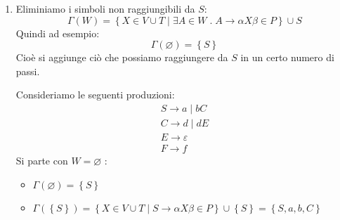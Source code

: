\documentclass[a4paper]{article}
\begin{document}
\begin{enumerate}
\begin{enumerate}
\begin{example}
\begin{itemize}
          \item \( \Gamma^3(\varnothing) = \Gamma(\left\{ B, S \right\}) \)\\
            \( = \left\{ A \in V \;\left|\; \exists \alpha \in (T \cup \left\{ B, S \right\})^* \;.\;
          A \to \alpha \right. \right\}\) \\ \( = \left\{ B, S \right\} \)
          \\
          Si è raggiunto il \textbf{punto fisso}, cioè non si ottengono più simboli
          nuovi.
          \end{itemize}
          Alla fine si ottiene l'insieme di tutti i simboli utili, cioè quelli che generano
          simboli terminali. Tutti gli altri (e le corrispondenti produzioni) vengono
          eliminati.

          \vspace{1em}
          \noindent
          Quindi \( S \to aS \;|\; B \;\; B \to b \) è equivalente ma senza simboli
          inutili che non generano nulla
        \end{example}
    \end{enumerate}

    \item \label{eliminazione_simboli_inutili_2}
      Eliminiamo i simboli non raggiungibili da \( S \):
      \[
        \Gamma(W) = \left\{ X \in V \cup T \;\left|\; \exists A \in W \;.\;
      A \to \alpha X \beta \in P \right. \right\} \cup S
      \] 
      Quindi ad esempio:
      \[
        \Gamma(\varnothing) = \left\{ S \right\}
      \] 
      Cioè si aggiunge ciò che possiamo raggiungere da \( S \) in un certo numero di passi.

      \begin{example}
        Consideriamo le seguenti produzioni:
        \[
        \begin{aligned}
          S \to a \;|\; bC\\
          C \to d \;|\;dE\\
          E \to \varepsilon\\
          F \to f
        \end{aligned}
        \] 
        Si parte con \( W = \varnothing \) :
        \begin{itemize}
          \item \( \Gamma(\varnothing) = \left\{ S \right\} \)

          \item \( \Gamma(\left\{ S \right\}) = \left\{ X \in V \cup T \;\left|\;
          S \to \alpha X \beta \in P \right. \right\} \cup \left\{ S \right\} =
          \left\{ S, a, b, C \right\} \)


\end{itemize}
\end{example}
\end{enumerate}
\end{document}
